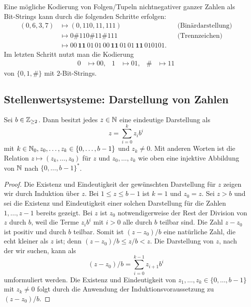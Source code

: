 \begin{bsp}
	Eine mögliche Kodierung von Folgen/Tupeln nichtnegativer ganzer Zahlen als Bit-Strings kann durch die folgenden Schritte erfolgen: 
	\begin{align*}
		(0, 6,3,7) & \mapsto (0,110,11,111)  & & \text{(Binärdarstellung)} 
		\\ & \mapsto 0 \mathbf{\#} 110 \mathbf{\#} 11 \mathbf{\#} 111 & & \text{(Trennzeichen)} 		
		\\ & \mapsto  00 \, \mathbf{11} \,  01 \,  01 \, 00 \, \mathbf{11 }\, 01 \, 01 \, \mathbf{11} \, 01 01 01.
	\end{align*}
	Im letzten Schritt nutzt man die Kodierung 
	\begin{align*}
		0 & \mapsto 00, & 1& \mapsto 01, &  \# & \mapsto 11
	\end{align*}
	von $\{0,1,\#\}$ mit $2$-Bit-Strings. 
\end{bsp} 


\subsection{Stellenwertsysteme: Darstellung von Zahlen}

\begin{thm} \label{thm:stellenwert}
	Sei $b \in \mathbb{Z}_{\ge 2}$. Dann besitzt jedes $z \in \mathbb{N}$ eine eindeutige Darstellung als 
	\begin{equation}\label{z:zur:Basis:b}
		z = \sum_{i=0}^k z_i b^i
	\end{equation}
	mit $k \in \mathbb{N}_0, z_0,\ldots,z_k \in \{0,\ldots,b-1\}$ und $z_k \ne 0$. Mit anderen Worten ist die Relation $z \mapsto (z_k,\ldots,z_0)$ für $z$ und $z_0,\ldots,z_k$ wie oben eine injektive Abbildung von $\mathbb{N}$ nach $\{0,\ldots,b-1\}^\ast$.
\end{thm}
\begin{proof}
 	Die Existenz und Eindeutigkeit der gewünschten Darstellung für $z$ zeigen wir durch Induktion über $z$. Bei $1 \le z \le b-1$ ist $k=1$ und $z_0=z$. Sei $z>b$ und sei die Existenz und Eindeutigkeit einer solchen Darstellung für die Zahlen $1,\ldots,z-1$ bereits gezeigt. Bei $z$ ist $z_0$ notwendigerweise der Rest der Division von $z$ durch $b$, weil die Terme $z_i b^i$ mit $i>0$ alle durch $b$ teilbar sind. Die Zahl $z-z_0$ ist positiv und durch $b$ teilbar. Somit ist $(z-z_0) / b$ eine natürliche Zahl, die echt kleiner als $z$ ist; denn $(z-z_0)/b \le z / b < z$. Die Darstellung von $z$, nach der wir suchen, kann als 
 	\[
 		(z-z_0)/b = \sum_{i=0}^{k-1} z_{i+1} b^i
 	\]
 	umformuliert werden. Die Existenz und Eindeutigkeit von $z_1,\ldots,z_k \in \{0,\ldots,b-1\}$ mit $z_k \ne 0$ folgt durch die Anwendung der Induktionsvoraussetzung zu $(z-z_0)/b$. 
\end{proof} 

